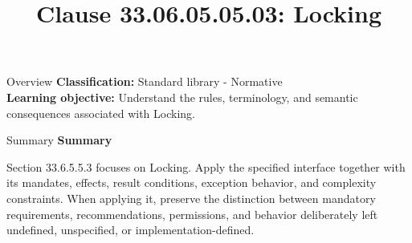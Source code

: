 \documentclass[10pt,letterpaper]{article}
\title{Clause 33.06.05.05.03: Locking}
\author{}
\date{}
\begin{document}
\maketitle
\begin{CornellOverviewBox}{Overview}
\textbf{Classification:} Standard library - Normative\\[2pt]
\textbf{Learning objective:} Understand the rules, terminology, and semantic consequences associated with Locking.
\end{CornellOverviewBox}\begin{CornellSummaryBox}{Summary}
{\sffamily\bfseries\color{Accent} Summary}\par\vspace{3pt}Section 33.6.5.5.3 focuses on Locking. Apply the specified interface together with its mandates, effects, result conditions, exception behavior, and complexity constraints. When applying it, preserve the distinction between mandatory requirements, recommendations, permissions, and behavior deliberately left undefined, unspecified, or implementation-defined.
\end{CornellSummaryBox}
\end{document}

